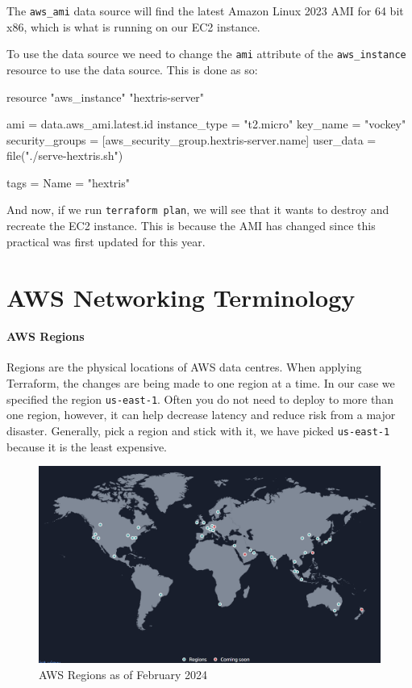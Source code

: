\documentclass{csse4400}
\begin{document}
The \texttt{aws\_ami} data source will find the latest Amazon Linux 2023 AMI for 64 bit x86, which is what is running on our EC2 instance.

To use the data source we need to change the \texttt{ami} attribute of the \texttt{aws\_instance} resource to use the data source. This is done as so:

\begin{code}[language=terraform,numbers=none]{}
resource "aws_instance" "hextris-server" {
  ami           = data.aws_ami.latest.id
  instance_type = "t2.micro"
  key_name      = "vockey"
  security_groups = [aws_security_group.hextris-server.name]
  user_data = file("./serve-hextris.sh")

  tags = {
    Name = "hextris"
  }
}
\end{code}

And now, if we run \texttt{terraform plan}, we will see that it wants to destroy and recreate the EC2 instance.
This is because the AMI has changed since this practical was first updated for this year.




\appendix

\section{AWS Networking Terminology}
\paragraph{AWS Regions}
Regions are the physical locations of AWS data centres.
When applying Terraform, the changes are being made to one region at a time.
In our case we specified the region \texttt{us-east-1}.
Often you do not need to deploy to more than one region, however,
it can help decrease latency and reduce risk from a major disaster.
Generally, pick a region and stick with it,
we have picked \texttt{us-east-1} because it is the least expensive.

\begin{figure}[ht]
\includegraphics[width=\textwidth]{images/aws_regions}
\caption{AWS Regions as of February 2024 \cite{aws-regions}}
\end{figure}
\end{document}
